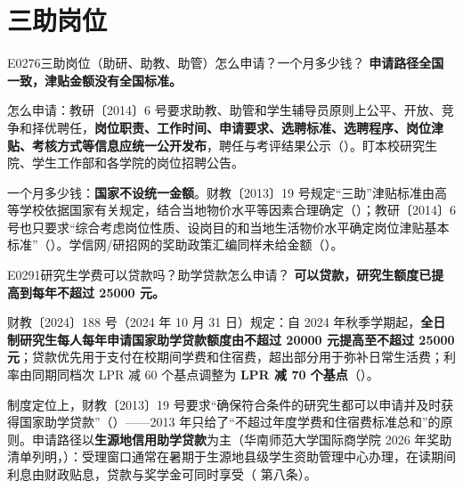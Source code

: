 \section{三助岗位}
\begin{qa}{E0276}{三助岗位（助研、助教、助管）怎么申请？一个月多少钱？}
\textbf{申请路径全国一致，津贴金额没有全国标准。}

怎么申请：教研〔2014〕6 号要求助教、助管和学生辅导员原则上公平、开放、竞争和择优聘任，\textbf{岗位职责、工作时间、申请要求、选聘标准、选聘程序、岗位津贴、考核方式等信息应统一公开发布}，聘任与考评结果公示（）。盯本校研究生院、学生工作部和各学院的岗位招聘公告。

一个月多少钱：\textbf{国家不设统一金额}。财教〔2013〕19 号规定“三助”津贴标准由高等学校依据国家有关规定，结合当地物价水平等因素合理确定（）；教研〔2014〕6 号也只要求“综合考虑岗位性质、设岗目的和当地生活物价水平确定岗位津贴基本标准”（）。学信网/研招网的奖助政策汇编同样未给金额（）。
\end{qa}

\begin{qa}{E0291}{研究生学费可以贷款吗？助学贷款怎么申请？}
\textbf{可以贷款，研究生额度已提高到每年不超过 25000 元。}

财教〔2024〕188 号（2024 年 10 月 31 日）规定：自 2024 年秋季学期起，\textbf{全日制研究生每人每年申请国家助学贷款额度由不超过 20000 元提高至不超过 25000 元}；贷款优先用于支付在校期间学费和住宿费，超出部分用于弥补日常生活费；利率由同期同档次 LPR 减 60 个基点调整为 \textbf{LPR 减 70 个基点}（）。

制度定位上，财教〔2013〕19 号要求“确保符合条件的研究生都可以申请并及时获得国家助学贷款”（）——2013 年只给了“不超过年度学费和住宿费标准总和”的原则。申请路径以\textbf{生源地信用助学贷款}为主（华南师范大学国际商学院 2026 年奖助清单列明，）：受理窗口通常在暑期于生源地县级学生资助管理中心办理，在读期间利息由财政贴息，贷款与奖学金可同时享受（ 第八条）。
\end{qa}

